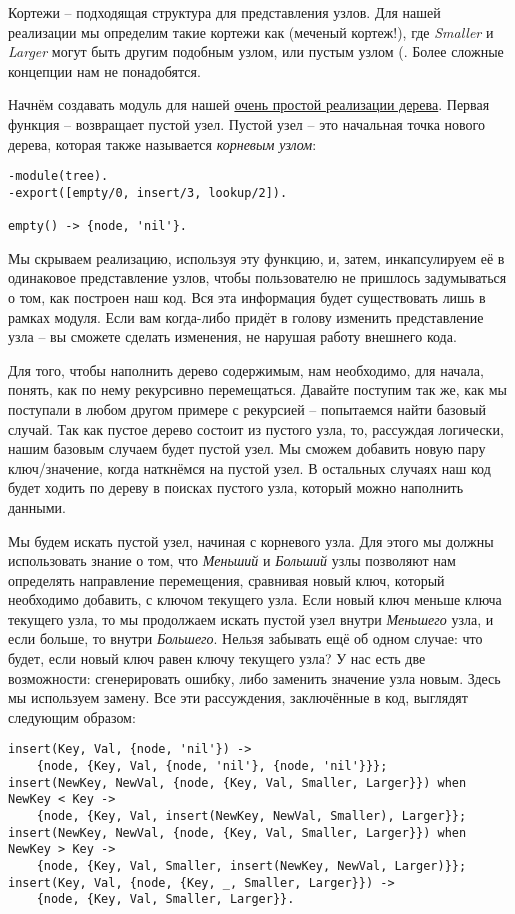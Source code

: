 Кортежи \--- подходящая структура для представления узлов. Для нашей реализации мы определим такие кортежи как  (меченый кортеж!), где \emph{Smaller} и \emph{Larger} могут быть другим подобным узлом, или пустым узлом (. Более сложные концепции нам не понадобятся.

Начнём создавать модуль для нашей \href{http://learnyousomeerlang.com/static/erlang/tree.erl}{очень простой реализации дерева}. Первая функция  \--- возвращает пустой узел. Пустой узел \--- это начальная точка нового дерева, которая также называется \emph{корневым узлом}:
\begin{lstlisting}[style=erlang]
-module(tree).
-export([empty/0, insert/3, lookup/2]).
 
empty() -> {node, 'nil'}.
\end{lstlisting}

Мы скрываем реализацию, используя эту функцию, и, затем, инкапсулируем её в одинаковое представление узлов, чтобы пользователю не пришлось задумываться о том, как построен наш код. Вся эта информация будет существовать лишь в рамках модуля. Если вам когда\--либо придёт в голову изменить представление узла \--- вы сможете сделать изменения, не нарушая работу внешнего кода.

Для того, чтобы наполнить дерево содержимым, нам необходимо, для начала, понять, как по нему рекурсивно перемещаться. Давайте поступим так же, как мы поступали в любом другом примере с рекурсией \--- попытаемся найти базовый случай. Так как пустое дерево состоит из пустого узла, то, рассуждая логически, нашим базовым случаем будет пустой узел. Мы сможем добавить новую пару ключ/значение, когда наткнёмся на пустой узел. В остальных случаях наш код будет ходить по дереву в поисках пустого узла, который можно наполнить данными.

Мы будем искать пустой узел, начиная с корневого узла. Для этого мы должны использовать знание о том, что \emph{Меньший} и \emph{Больший} узлы позволяют нам определять направление перемещения, сравнивая новый ключ, который необходимо добавить, с ключом текущего узла. Если новый ключ меньше ключа текущего узла, то мы продолжаем искать пустой узел внутри \emph{Меньшего} узла, и если больше, то внутри \emph{Большего}. Нельзя забывать ещё об одном случае: что будет, если новый ключ равен ключу текущего узла? У нас есть две возможности: сгенерировать ошибку, либо заменить значение узла новым. Здесь мы используем замену. Все эти рассуждения, заключённые в код, выглядят следующим образом:
\begin{lstlisting}[style=erlang]
insert(Key, Val, {node, 'nil'}) ->
    {node, {Key, Val, {node, 'nil'}, {node, 'nil'}}};
insert(NewKey, NewVal, {node, {Key, Val, Smaller, Larger}}) when NewKey < Key ->
    {node, {Key, Val, insert(NewKey, NewVal, Smaller), Larger}};
insert(NewKey, NewVal, {node, {Key, Val, Smaller, Larger}}) when NewKey > Key ->
    {node, {Key, Val, Smaller, insert(NewKey, NewVal, Larger)}};
insert(Key, Val, {node, {Key, _, Smaller, Larger}}) ->
    {node, {Key, Val, Smaller, Larger}}.
\end{lstlisting}

